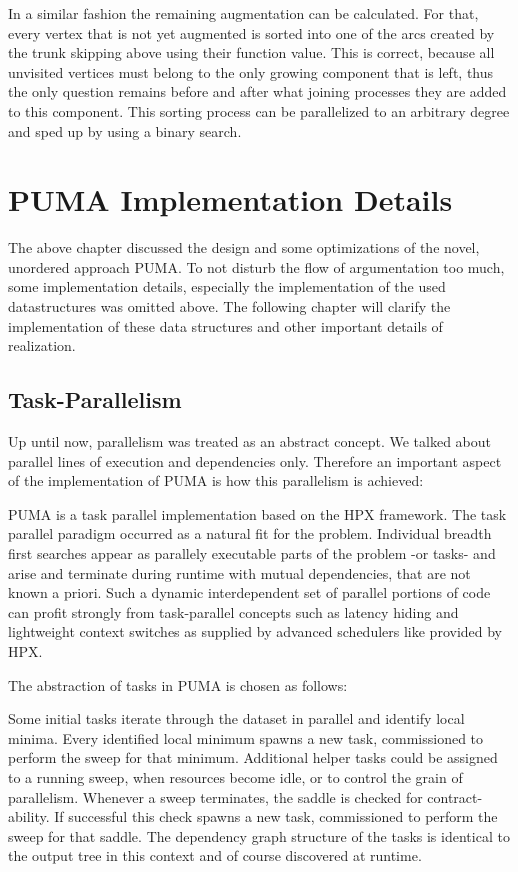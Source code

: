 \documentclass{scrartcl}
\begin{document}
In a similar fashion the remaining augmentation can be calculated. For that, every vertex that is not yet augmented is sorted into one of the arcs created by the trunk skipping above using their function value. This is correct, because all unvisited vertices must belong to the only growing component that is left, thus the only question remains before and after what joining processes they are added to this component. This sorting process can be parallelized to an arbitrary degree and sped up by using a binary search.


\section{PUMA Implementation Details}
The above chapter discussed the design and some optimizations of the novel, unordered approach PUMA. To not disturb the flow of argumentation too much, some implementation details, especially the implementation of the used datastructures was omitted above. The following chapter will clarify the implementation of these data structures and other important details of realization. 

\subsection{Task-Parallelism}
Up until now, parallelism was treated as an abstract concept. We talked about parallel lines of execution and dependencies only. Therefore an important aspect of the implementation of PUMA is how this parallelism is achieved:

PUMA is a task parallel implementation based on the HPX framework. The task parallel paradigm occurred as a natural fit for the problem. Individual breadth first searches appear as parallely executable parts of the problem -or tasks- and arise and terminate during runtime with mutual dependencies, that are not known a priori. Such a dynamic interdependent set of parallel portions of code can profit strongly from task-parallel concepts such as latency hiding and lightweight context switches as supplied by advanced schedulers like provided by HPX. 

The abstraction of tasks in PUMA is chosen as follows:

Some initial tasks iterate through the dataset in parallel and identify local minima. Every identified local minimum spawns a new task, commissioned to perform the sweep for that minimum. Additional helper tasks could be assigned to a running sweep, when resources become idle, or to control the grain of parallelism. Whenever a sweep terminates, the saddle is checked for contract-ability. If successful this check spawns a new task, commissioned to perform the sweep for that saddle. The dependency graph structure of the tasks is identical to the output tree in this context and of course discovered at runtime.
\end{document}
